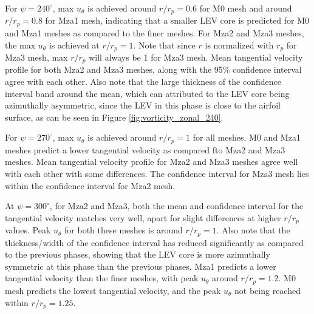 For $\psi = 240^\circ$, max $u_\theta$ is achieved around $r/r_p= 0.6$ for M0 mesh and around $r/r_p= 0.8$ for Mza1 mesh, indicating that a smaller LEV core is predicted for M0 and Mza1 meshes as compared to the finer meshes. 
For Mza2 and Mza3 meshes, the max $u_\theta$ is achieved at $r/r_p = 1$. Note that since $r$ is normalized with $r_p$ for Mza3 mesh, max $r/r_p$ will always be 1 for Mza3 mesh. 
Mean tangential velocity profile for both Mza2 and Mza3 meshes, along with the 95\% confidence interval agree with each other. Also note that the large thickness of the confidence interval band around the mean, which can attributed to the LEV core being azimuthally asymmetric, since the LEV in this phase is close to the airfoil surface, as can be seen in Figure \ref{fig:vorticity_zonal_240}. 

For $\psi = 270^\circ$, max $u_\theta$ is achieved around $r/r_p= 1$ for all meshes. M0 and Mza1 meshes predict a lower tangential velocity as compared fto Mza2 and Mza3 meshes. Mean tangential velocity profile for Mza2 and Mza3 meshes agree well with each other with some differences. The confidence interval for Mza3 mesh lies within the confidence interval for Mza2 mesh.

At $\psi = 300^\circ$, for Mza2 and Mza3, both the mean and confidence interval for the tangential velocity matches very well, apart for slight differences at higher $r/r_p$ values. Peak $u_\theta$ for both these meshes is around $r/r_p= 1$.  Also note that the thickness/width of the confidence interval has reduced significantly as compared to the previous phases, showing that the LEV core is more azimuthally symmetric at this phase than the previous phases. Mza1 predicts a lower tangential velocity than the finer meshes, with peak $u_\theta$ around $r/r_p= 1.2$. M0 mesh predicts the lowest tangential velocity, and the peak $u_\theta$ not being reached within $r/r_p= 1.25$.

